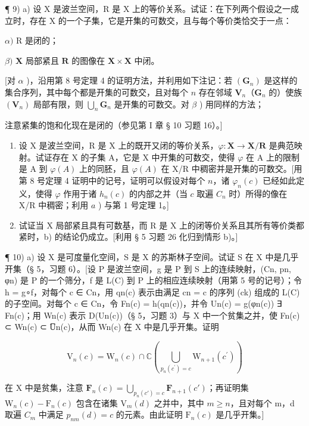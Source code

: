 ¶ 9) a) 设 X 是波兰空间，R 是 X 上的等价关系。试证：在下列两个假设之一成立时，存在 X 的一个子集，它是开集的可数交，且与每个等价类恰交于一点：

\(\alpha)\) R 是闭的；

\(\beta)\) \(\mathbf{X}\) 局部紧且 \(\mathbf{R}\) 的图像在 \(\mathbf{X} \times \mathbf{X}\) 中闭。

{[}对 \(\alpha\) )，沿用第 8 号定理 4 的证明方法，并利用如下注记：若 \((\mathbf{G}_n)\) 是这样的集合序列，其中每个都是开集的可数交，且对每个 \(n\) 存在邻域 \(\mathbf{V}_n\)（\(\mathbf{G}_n\) 的）使族 \((\mathbf{V}_n)\) 局部有限，则 \(\bigcup_{n} \mathbf{G}_n\) 是开集的可数交。对 \(\beta\) ) 用同样的方法；

注意紧集的饱和化现在是闭的（参见第 I 章 § 10 习题 16）。{]}

\begin{enumerate}
\def\labelenumi{\alph{enumi})}
\setcounter{enumi}{1}
\item
  设 X 是波兰空间，R 是 X 上的既开又闭的等价关系，\(\varphi: \mathbf{X} \to \mathbf{X} / \mathbf{R}\) 是典范映射。试证存在 X 的子集 A，它是 X 中开集的可数交，使得 \(\varphi\) 在 A 上的限制是 A 到 \(\varphi(A)\) 上的同胚，且 \(\varphi(A)\) 在 X/R 中稠密并是开集的可数交。{[}用第 8 号定理 4 证明中的记号，证明可以假设对每个 \(n\)，诸 \(\varphi_n(c)\) 已经如此定义，使得 \(\varphi\) 作用于诸 \(h_n(c)\) 的内部之并（当 \(c\) 取遍 \(C_n\) 时）所得的像在 X/R 中稠密；利用 \(a\) ) 与第 1 号定理 1。{]}
\item
  试证当 X 局部紧且具有可数基，而 R 是 X 上的闭等价关系且其所有等价类都紧时，b) 的结论仍成立。{[}利用 § 5 习题 26 化归到情形 b)。{]}
\end{enumerate}

¶ 10) a) 设 X 是可度量化空间，S 是 X 的苏斯林子空间。试证 S 在 X 中是几乎开集（§ 5，习题 6）。{[}设 P 是波兰空间，g 是 P 到 S 上的连续映射，(Cn, pn, φn) 是 P 的一个筛分，f 是 L(C) 到 P 上的相应连续映射（用第 5 号的记号）；令 h = g∘f，对每个 c ∈ Cn，用 qn(c) 表示由满足 cn = c 的序列 (ck) 组成的 L(C) 的子空间。对每个 c ∈ Cn，令 Fn(c) = h(qn(c))，并令 Un(c) = g(φn(c)) ∃ Fn(c)；用 Wn(c) 表示 D(Un(c))（§ 5，习题 3）与 X 中一个贫集之并，使 Fn(c) ⊂ Wn(c) ⊂ U̅n(c)，从而 Wn(c) 在 X 中是几乎开集。证明

\[
\mathrm{V} _ {n} (c) = \mathrm{W} _ {n} (c) \cap \mathbb {C} \left(\bigcup_ {p _ {n} \left(c ^ {\prime}\right) = c} \mathrm{W} _ {n + 1} \left(c ^ {\prime}\right)\right)
\]

在 X 中是贫集，注意 \(\mathbf{F}_n(c) = \bigcup_{p_n(c') = c}\mathbf{F}_{n + 1}(c')\)；再证明集 \(\mathrm{W}_{n}(c)-\mathrm{F}_{n}(c)\) 包含在诸集 \(\mathrm{V}_{m}(d)\) 之并中，其中 \(m\geqslant n\)，且对每个 m，d 取遍 \(C_{m}\) 中满足 \(p_{nm}(d)=c\) 的元素。由此证明 \(\mathrm{F}_{n}(c)\) 是几乎开集。{]}

